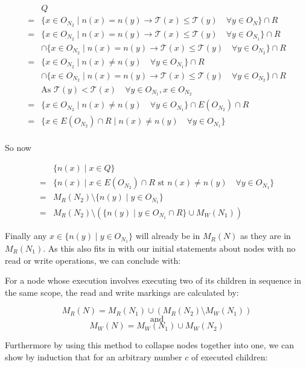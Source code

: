 \documentclass[twoside,a4paper]{report}
\begin{document}
\begin{align*}
& Q \\
=& \{x \in O_{N_2} \mid n(x) = n(y) \rightarrow \mathcal{T}(x) \le \mathcal{T}(y) \quad \forall y \in O_N \} \cap R \\
=& \{x \in O_{N_2} \mid n(x) = n(y) \rightarrow \mathcal{T}(x) \le \mathcal{T}(y) \quad \forall y \in O_{N_1} \} \cap R \\
& \cap \{x \in O_{N_2} \mid n(x) = n(y) \rightarrow \mathcal{T}(x) \le \mathcal{T}(y) \quad \forall y \in O_{N_2} \} \cap R \\
=& \{x \in O_{N_2} \mid n(x) \ne n(y) \quad \forall y \in O_{N_1} \} \cap R \\
& \cap \{x \in O_{N_2} \mid n(x) = n(y) \rightarrow \mathcal{T}(x) \le \mathcal{T}(y) \quad \forall y \in O_{N_2} \} \cap R \\
& \text{As } \mathcal{T}(y) < \mathcal{T}(x) \quad \forall y \in O_{N_1}, x \in O_{N_2} \\
=& \{x \in O_{N_2} \mid n(x) \ne n(y) \quad \forall y \in O_{N_1} \} \cap E(O_{N_2}) \cap R \\
=& \{x \in E(O_{N_2}) \cap R \mid n(x) \ne n(y) \quad \forall y \in O_{N_1} \} \\
\end{align*}

So now

\begin{align*}
& \{ n(x) \mid x \in Q \} \\
=& \{ n(x) \mid x \in E(O_{N_2}) \cap R \text{ st } n(x) \ne n(y) \quad \forall y \in O_{N_1} \} \\
=& M_R(N_2) \setminus \{ n(y) \mid y \in O_{N_1} \} \\
=& M_R(N_2) \setminus (\{ n(y) \mid y \in O_{N_1} \cap R \} \cup M_W(N_1)) 
\end{align*}

Finally any $x \in \{ n(y) \mid y \in O_{N_1} \}$ will already be in $M_R(N)$ as they are in $M_R(N_1)$. As this also fits in with
our initial statements about nodes with no read or write operations, we can conclude with:

For a node whose execution involves executing two of its children in sequence in the same scope, the read and write markings are calculated by:

$$M_R(N) = M_R(N_1) \cup (M_R(N_2) \setminus M_W(N_1))$$
$$\text{and}$$
$$M_W(N) = M_W(N_1) \cup M_W(N_2)$$

Furthermore by using this method to collapse nodes together into one, we can show by induction that for an arbitrary number $c$ of executed children:
\end{document}
